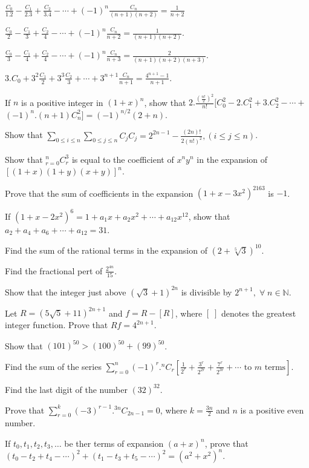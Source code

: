 \item $\frac{C_0}{1.2} - \frac{C_1}{2.3} + \frac{C_2}{3.4} - \cdots + (-1)^n\frac{C_n}{(n + 1)(n + 2)} = \frac{1}{n + 2}$
\item $\frac{C_0}{2} - \frac{C_1}{3} + \frac{C_2}{4} - \cdots + (-1)^n\frac{C_n}{n + 2} = \frac{1}{(n + 1)(n + 2)}$.
\item $\frac{C_0}{3} - \frac{C_1}{4} + \frac{C_2}{4} - \cdots + (-1)^n\frac{C_n}{n + 3} = \frac{2}{(n + 1)(n + 2)(n + 3)}$.
\item $3.C_0 + 3^2\frac{C_1}{2} + 3^3\frac{C_2}{3} + \cdots + 3^{n + 1}\frac{C_n}{n+ 1} = \frac{4^{n + 1} - 1}{n + 1}$.
\item If $n$ is a positive integer in $(1 + x)^n$, show that $2.\frac{\left(\frac{n!}{2}\right)^2}{n!}[C_0^2 - 2.C_1^2 +
  3.C_2^2 - \cdots + $ $(-1)^n.(n + 1)C_n^2] = (-1)^{n/2}(2 + n)$.
\item Show that $\displaystyle\sum_{0\leq i\leq n}\sum_{0\leq j\leq n}C_jC_j = 2^{2n - 1} - \frac{(2n)!}{2(n!)^2}, (i\leq j\leq
  n)$.
\item Show that $\displaystyle_{r=0}^nC_r^3$ is equal to the coefficient of $x^ny^n$ in the expansion of $[(1 + x)(1 + y)(x +
  y)]^n$.
\item Prove that the sum of coefficients in the expansion $(1 + x -3x^2)^{2163}$ is $-1$.
\item If $(1 + x - 2x^2)^6 = 1 + a_1x + a_2x^2 + \cdots + a_{12}x^{12}$, show that $a_2 + a_4 + a_6 + \cdots + a_{12} = 31$.
\item Find the sum of the rational terms in the expansion of $(2 + \sqrt[5]{3})^{10}$.
\item Find the fractional pert of $\frac{2^{4n}}{15}$.
\item Show that the integer just above $(\sqrt{3} + 1)^{2n}$ is divisible by $2^{n + 1},\;\forall\;n\in\mathbb{N}$.
\item Let $R = (5\sqrt{5} + 11)^{2n + 1}$ and $f = R - [R]$, where $[\;]$ denotes the greatest integer function. Prove that $Rf =
  4^{2n + 1}$.
\item Show that $(101)^{50} > (100)^{50} + (99)^{50}$.
\item Find the sum of the series $\displaystyle\sum_{r=0}^n(-1)^r.{}^nC_r\left[\frac{1}{2^r} + \frac{3^r}{2^{2r}} +
  \frac{7^r}{2^{3r}} + \cdots \text{~to~}m\text{~terms}\right]$.
\item Find the last digit of the number $(32)^{32}$.
\item Prove that $\displaystyle\sum_{r=0}^k(-3)^{r - 1}.{}^{3n}C_{2n- 1} = 0$, where $k = \frac{3n}{2}$ and $n$ is a positive even
  number.
\item If $t_0, t_1, t_2, t_3, \ldots$ be ther terms of expansion $(a + x)^n$, prove that $(t_0 - t_2 + t_4 - \cdots)^2 + (t_1 - t_3
  + t_5 - \cdots)^2 = (a^2 + x^2)^n$.
\stopitemize

